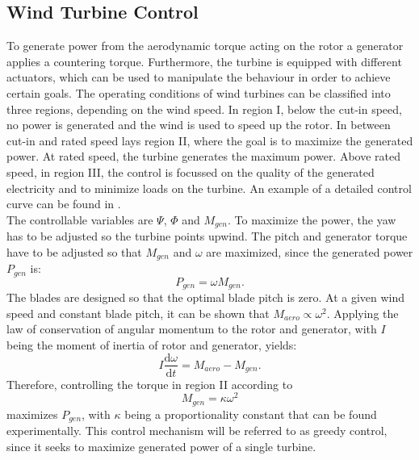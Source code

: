 \subsection{Wind Turbine Control}
\label{sec:WTC}
To generate power from the aerodynamic torque acting on the rotor a generator applies a countering torque. Furthermore, the turbine is equipped with different actuators, which can be used to manipulate the behaviour in order to achieve certain goals. The operating conditions of wind turbines can be classified into three regions, depending on the wind speed. In region I, below the cut-in speed, no power is generated and the wind is used to speed up the rotor. In between cut-in and rated speed lays region II, where the goal is to maximize the generated power. At rated speed, the turbine generates the maximum power. Above rated speed, in region III, the control is focussed on the quality of the generated electricity and to minimize loads on the turbine. An example of a detailed control curve can be found in \cite{jonkman_definition_2009}. \cite{boersma_tutorial_2017} \\
The controllable variables are $\Psi$, $\Phi$ and $M_{gen}$. To maximize the power, the yaw has to be adjusted so the turbine points upwind. The pitch and generator torque have to be adjusted so that $M_{gen}$ and $\omega$ are maximized, since the generated power $P_{gen}$ is: 
\begin{equation}
	P_{gen} = \omega M_{gen}.
\end{equation} The blades are designed so that the optimal blade pitch is zero. At a given wind speed and constant blade pitch, it can be shown that $M_{aero} \propto \omega^2$. Applying the law of conservation of angular momentum to the rotor and generator, with $I$ being the moment of inertia of rotor and generator, yields:
\begin{equation}
	I\frac{\mathrm{d}\omega}{\mathrm{d}t} = M_{aero} - M_{gen}. \label{eq:ang_mom}
\end{equation} 
Therefore, controlling the torque in region II according to
\begin{equation}
	M_{gen} = \kappa \omega^2 \label{eq:control} 
\end{equation} maximizes $P_{gen}$, with $\kappa$ being a proportionality constant that can be found experimentally. This control mechanism will be referred to as greedy control, since it seeks to maximize generated power of a single turbine. \cite[p.63 - 77]{hansen_aerodynamics_2008}
